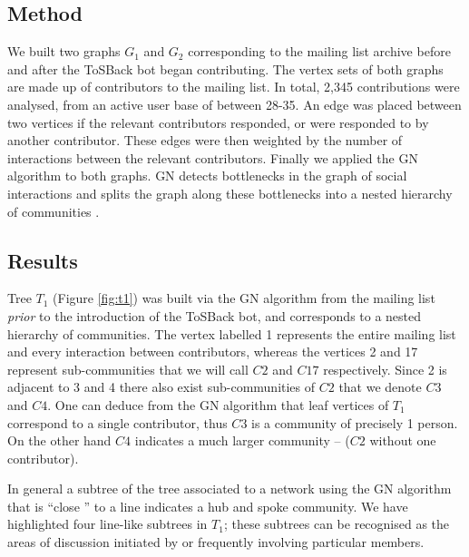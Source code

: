 \documentclass{sig-alternate}
\begin{document}
\subsection{Method}

We built two graphs $G_{1}$ and $G_2$ corresponding to the mailing list archive before and after the ToSBack bot began contributing. The vertex sets of both graphs are made up of contributors to the mailing list. In total, 2,345 contributions were analysed, from an active user base of between 28-35. An edge was placed between two vertices if the relevant contributors responded, or were responded to by another contributor. These edges were then weighted by the number of interactions between the relevant contributors. Finally we applied the GN algorithm to both graphs. GN detects bottlenecks in the graph of social interactions and splits the graph along these bottlenecks into  a nested hierarchy of communities .
\subsection{Results}
Tree $T_1$ (Figure \ref{fig:t1}) was built via the GN algorithm from the mailing list \emph{prior} to the introduction of the ToSBack bot, and corresponds to a nested hierarchy of communities. The vertex labelled 1 represents the entire mailing list and every interaction between contributors, whereas the vertices 2 and 17 represent sub-communities that we will call $C2$ and $C17$ respectively. Since 2 is adjacent to 3 and 4 there also exist sub-communities of $C2$ that we denote $C3$ and $C4$. One can deduce from the GN algorithm that leaf vertices of $T_1$ correspond to a single contributor, thus $C3$ is a community of precisely 1 person. On the other hand $C4$ indicates a much larger community – ($C2$ without one contributor).

In general a subtree of the tree associated to a network using the GN algorithm that is “close ” to a line indicates a hub and spoke community. We have highlighted four line-like subtrees in $T_1$; these subtrees can be recognised as the areas of discussion initiated by or frequently involving particular members.
\end{document}
